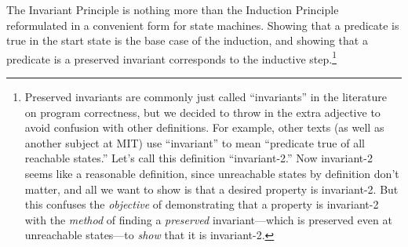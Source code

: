 The Invariant Principle is nothing more than the Induction Principle
reformulated in a convenient form for state machines.  Showing that a
predicate is true in the start state is the base case of the
induction, and showing that a predicate is a preserved invariant
corresponds to the inductive step.\footnote{Preserved invariants are
  commonly just called ``invariants'' in the literature on program
  correctness, but we decided to throw in the extra adjective to avoid
  confusion with other definitions.  For example, other texts (as well
  as another subject at MIT) use ``invariant'' to mean ``predicate
  true of all reachable states.''  Let's call this definition
  ``invariant-2.''  Now invariant-2 seems like a reasonable
  definition, since unreachable states by definition don't matter, and
  all we want to show is that a desired property is invariant-2.  But
  this confuses the \emph{objective} of demonstrating that a property
  is invariant-2 with the \emph{method} of finding a \emph{preserved}
  invariant---which is preserved even at unreachable states---to
  \emph{show} that it is invariant-2.}

